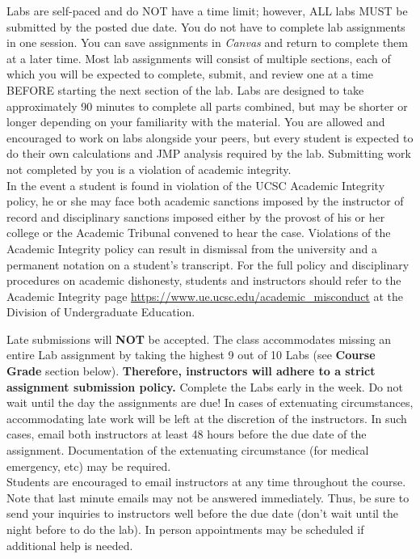 \documentclass[11pt]{article}
\begin{document}
Labs are self-paced and do NOT have a time limit; however, ALL labs
MUST be submitted by the posted due date. You do not have to complete
lab assignments in one session. You can save
assignments in {\em Canvas} and return to complete them at a later time.
Most lab assignments will consist of multiple sections, each of which
you will be expected to complete, submit, and review one at a time
BEFORE starting the next section of the lab.  Labs are designed to
take approximately 90 minutes to complete all parts combined, but may
be shorter or longer depending on your familiarity with the
material. You are allowed and encouraged to work on labs alongside
your peers, but every student is expected to do their own calculations
and JMP analysis required by the lab. Submitting work not completed by you is a violation of academic integrity. \\

In the event a student is found in violation of the UCSC Academic Integrity policy, he or she may face both academic sanctions imposed by the instructor of record and disciplinary sanctions imposed either by the provost of his or her college or the Academic Tribunal convened to hear the case. Violations of the Academic Integrity policy can result in dismissal from the university and a permanent notation on a student's transcript.
For the full policy and disciplinary procedures on academic dishonesty, students and instructors should refer to the Academic Integrity page \url{https://www.ue.ucsc.edu/academic_misconduct} at the Division of Undergraduate Education.
\vspace{0.2in}

 Late submissions will {\bf NOT} be
accepted. The class accommodates missing an entire Lab assignment by
taking the highest 9 out of 10 Labs (see {\bf Course Grade} section
below). {\bf Therefore, instructors will adhere to a strict assignment
submission policy. } Complete the Labs early in the week. Do not wait
until the day the assignments are due!  In cases of extenuating
circumstances, accommodating late work will be left at the discretion of the instructors. In such cases, email both instructors at least 48 hours before the due date of the assignment. Documentation of the extenuating circumstance (for medical emergency, etc) may be required.\\
 
  Students are encouraged to email
 instructors at any time throughout the course. Note that last minute
 emails may not be answered immediately. Thus, be sure to send your
 inquiries to instructors well before the due date (don't wait until
 the night before to do the lab). In person appointments may be
 scheduled if additional help is needed. \\
\end{document}
